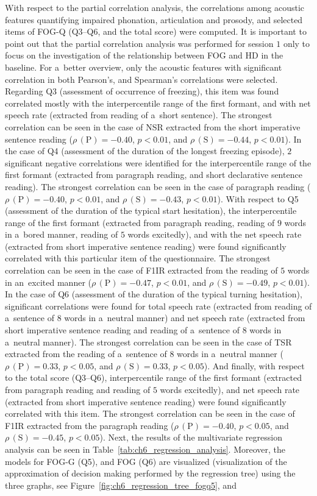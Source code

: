 With respect to the partial correlation analysis, the correlations among acoustic features quantifying impaired phonation, articulation and prosody, and selected items of FOG-Q (Q3--Q6, and the total score) were computed. It is important to point out that the partial correlation analysis was performed for session $1$ only to focus on the investigation of the relationship between FOG and HD in the baseline. For a~better overview, only the acoustic features with significant correlation in both Pearson's, and Spearman's correlations were selected. Regarding Q3 (assessment of occurrence of freezing), this item was found correlated mostly with the interpercentile range of the first formant, and with net speech rate (extracted from reading of a~short sentence). The strongest correlation can be seen in the case of NSR extracted from the short imperative sentence reading ($\rho\,(\mbox{P})=-0.40$, $p<0.01$, and $\rho\,(\mbox{S})=-0.44$, $p<0.01$). In the case of Q4 (assessment of the duration of the longest freezing episode), $2$ significant negative correlations were identified for the interpercentile range of the first formant (extracted from paragraph reading, and short declarative sentence reading). The strongest correlation can be seen in the case of paragraph reading ($\rho\,(\mbox{P})=-0.40$, $p<0.01$, and $\rho\,(\mbox{S})=-0.43$, $p<0.01$). With respect to Q5 (assessment of the duration of the typical start hesitation), the interpercentile range of the first formant (extracted from paragraph reading, reading of $9$ words in a~bored manner, reading of $5$ words excitedly), and with the net speech rate (extracted from short imperative sentence reading) were found significantly correlated with this particular item of the questionnaire. The strongest correlation can be seen in the case of F1IR extracted from the reading of $5$ words in an~excited manner ($\rho\,(\mbox{P})=-0.47$, $p<0.01$, and $\rho\,(\mbox{S})=-0.49$, $p<0.01$). In the case of Q6 (assessment of the duration of the typical turning hesitation), significant correlations were found for total speech rate (extracted from reading of a~sentence of $8$ words in a~neutral manner) and net speech rate (extracted from short imperative sentence reading and reading of a~sentence of $8$ words in a~neutral manner). The strongest correlation can be seen in the case of TSR extracted from the reading of a~sentence of $8$ words in a~neutral manner ($\rho\,(\mbox{P})=0.33$, $p<0.05$, and $\rho\,(\mbox{S})=0.33$, $p<0.05$). And finally, with respect to the total score (Q3--Q6), interpercentile range of the first formant (extracted from paragraph reading and reading of $5$ words excitedly), and net speech rate (extracted from short imperative sentence reading) were found significantly correlated with this item. The strongest correlation can be seen in the case of F1IR extracted from the paragraph reading ($\rho\,(\mbox{P})=-0.40$, $p<0.05$, and $\rho\,(\mbox{S})=-0.45$, $p<0.05$). Next, the results of the multivariate regression analysis can be seen in Table~\ref{tab:ch6_regression_analysis}. Moreover, the models for FOG-G (Q5), and FOG (Q6) are visualized (visualization of the approximation of decision making performed by the regression tree) using the three graphs, see Figure~\ref{fig:ch6_regression_tree_fogq5}, and 